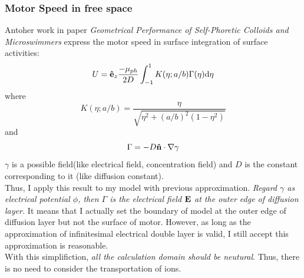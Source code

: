 \documentclass[fontsize=11pt, %
                             paper=a4, %
                             twoside, %
                             captions=tableheading,
                             index=totoc,
                             hyperref]{labbook}
\begin{document}
\begin{addmargin}[4cm]{0cm}
\subsubsection{Motor Speed in free space}
Antoher work in paper \emph{Geometrical Performance of Self-Phoretic Colloids and Microswimmers}\cite{Nourhani2016} express the motor speed in surface integration of surface activities:
\begin{equation}
U=\mathbf{\hat{e}}_z \frac{-\mu_{ph}}{2D}\int_{-1}^1 K(\eta;a/b)\Gamma(\eta)\mathrm{d}\eta
\end{equation}
where
\begin{equation}
K(\eta;a/b)=\frac{\eta}{\sqrt{\eta^2+(a/b)^2(1-\eta^2)}}
\end{equation}
and
\begin{equation}
\Gamma=-D\mathbf{\hat{n}} \cdot \nabla \gamma
\end{equation}
$\gamma$ is a possible field(like electrical field, concentration field) and $D$ is the constant corresponding to it (like diffusion constant).\\
Thus, I apply this result to my model with previous approximation. \emph{Regard $\gamma$ as electrical potential $\phi$, then $\Gamma$ is the electrical field $\mathbf{E}$ at the outer edge of diffusion layer.} It means that I actually set the boundary of model at the outer edge of diffusion layer but not the surface of motor. However, as long as the approximation of infinitesimal electrical double layer is valid, I still accept this approximation is reasonable.\\
With this simplifiction, \emph{all the calculation domain should be neutural}. Thus, there is no need to consider the transportation of ions.

\end{addmargin}
\end{document}
